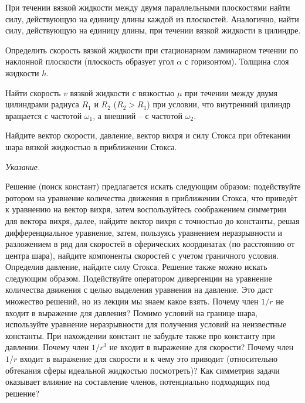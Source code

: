 \documentclass[14pt]{extarticle}
\begin{document}
\begin{problems}
	
	\item 
	При течении вязкой жидкости между двумя параллельными плоскостями найти силу, действующую на единицу длины каждой из плоскостей. Аналогично, найти силу, действующую на единицу длины, при течении вязкой жидкости в цилиндре. 
	
	\item 
	Определить скорость вязкой жидкости при стационарном ламинарном течении по наклонной плоскости (плоскость образует угол $\alpha$ с горизонтом). Толщина слоя жидкости $h$.
	
	\item 
	Найти скорость $v$ вязкой жидкости с вязкостью $\mu$ при течении между двумя цилиндрами радиуса $R_1$ и $R_2$ ($R_2>R_1$) при условии, что внутренний цилиндр вращается с частотой $\omega_1$, а внешний -- с частотой $\omega_2$.
	

	
	\item 
	Найдите вектор скорости, давление, вектор вихря и силу Стокса при обтекании шара вязкой жидкостью в приближении Стокса.
	
	{\small
	\textit{Указание.}	
	
	Решение (поиск констант) предлагается искать следующим образом: подействуйте ротором на уравнение количества движения в приближении Стокса, что приведёт к уравнению на вектор вихря, затем воспользуйтесь соображением симметрии для вектора вихря, далее, найдите вектор вихря с точностью до константы, решая дифференциальное уравнение, затем, пользуясь уравнением неразрывности и разложением в ряд для скоростей в сферических координатах (по расстоянию от центра шара), найдите компоненты скоростей с учетом граничного условия. Определив давление, найдите силу Стокса.  \newline		
	Решение  также можно искать следующим образом. Подействуйте оператором дивергенции на уравнение количества движения с целью выделения уравнения на давление. Это даст множество решений, но из лекции мы знаем какое взять. Почему член $1/r$ не входит в выражение для давления? Помимо условий на границе шара, используйте уравнение неразрывности для получения условий на неизвестные константы. При нахождении констант не забудьте также про константу при давлении. Почему член $1/r^3$ не входит в выражение для скорости? Почему член $1/r$  входит в выражение для скорости и к чему это приводит (относительно обтекания сферы идеальной жидкостью посмотреть)? Как симметрия задачи оказывает влияние на составление членов, потенциально подходящих под решение?
	}


\end{problems}
\end{document}
